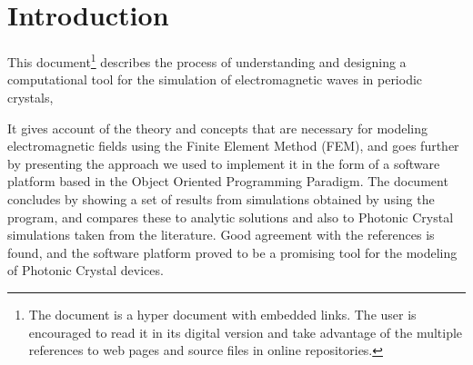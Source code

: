 \cleardoublepage {}
{}
\chapter*{Introduction}

This document\footnote{The document is a hyper document with embedded links. The user is encouraged to read it in its digital version and take advantage of the multiple references to web pages and source files in online repositories.} describes the process of understanding and designing a computational tool for the simulation of electromagnetic waves in periodic crystals,  

It gives account of the  theory and concepts that are necessary for modeling electromagnetic fields using the Finite Element Method (FEM), and goes further by presenting the approach we used to implement it in the form of a software platform based in the Object Oriented Programming Paradigm. The document concludes by showing a set of results from simulations obtained by using the program, and compares these to analytic solutions and also to Photonic Crystal simulations taken from the literature. Good agreement with the references is found, and the software platform proved to be a promising tool for the modeling of Photonic Crystal devices.

